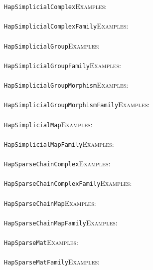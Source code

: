 \documentclass[a4paper,11pt]{report}
\begin{document}
{{ \texttt{HapSimplicialComplex}{\nobreakspace}{\nobreakspace}{\nobreakspace}{\nobreakspace}\textsc{Examples:} \\
 \\
 \texttt{HapSimplicialComplexFamily}{\nobreakspace}{\nobreakspace}{\nobreakspace}{\nobreakspace}\textsc{Examples:} \\
 \\
 \texttt{HapSimplicialGroup}{\nobreakspace}{\nobreakspace}{\nobreakspace}{\nobreakspace}\textsc{Examples:} \\
 \\
 \texttt{HapSimplicialGroupFamily}{\nobreakspace}{\nobreakspace}{\nobreakspace}{\nobreakspace}\textsc{Examples:} \\
 \\
 \texttt{HapSimplicialGroupMorphism}{\nobreakspace}{\nobreakspace}{\nobreakspace}{\nobreakspace}\textsc{Examples:} \\
 \\
 \texttt{HapSimplicialGroupMorphismFamily}{\nobreakspace}{\nobreakspace}{\nobreakspace}{\nobreakspace}\textsc{Examples:} \\
 \\
 \texttt{HapSimplicialMap}{\nobreakspace}{\nobreakspace}{\nobreakspace}{\nobreakspace}\textsc{Examples:} \\
 \\
 \texttt{HapSimplicialMapFamily}{\nobreakspace}{\nobreakspace}{\nobreakspace}{\nobreakspace}\textsc{Examples:} \\
 \\
 \texttt{HapSparseChainComplex}{\nobreakspace}{\nobreakspace}{\nobreakspace}{\nobreakspace}\textsc{Examples:} \\
 \\
 \texttt{HapSparseChainComplexFamily}{\nobreakspace}{\nobreakspace}{\nobreakspace}{\nobreakspace}\textsc{Examples:} \\
 \\
 \texttt{HapSparseChainMap}{\nobreakspace}{\nobreakspace}{\nobreakspace}{\nobreakspace}\textsc{Examples:} \\
 \\
 \texttt{HapSparseChainMapFamily}{\nobreakspace}{\nobreakspace}{\nobreakspace}{\nobreakspace}\textsc{Examples:} \\
 \\
 \texttt{HapSparseMat}{\nobreakspace}{\nobreakspace}{\nobreakspace}{\nobreakspace}\textsc{Examples:} \\
 \\
 \texttt{HapSparseMatFamily}{\nobreakspace}{\nobreakspace}{\nobreakspace}{\nobreakspace}\textsc{Examples:} \\
}}
\end{document}
